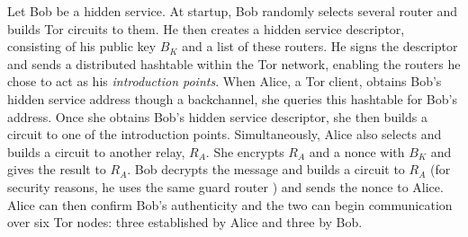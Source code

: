 Let Bob be a hidden service. At startup, Bob randomly selects several router and builds Tor circuits to them. He then creates a hidden service descriptor, consisting of his public key $ B_{K} $ and a list of these routers. He signs the descriptor and sends a distributed hashtable within the Tor network, enabling the routers he chose to act as his \textit{introduction points}. When Alice, a Tor client, obtains Bob's hidden service address though a backchannel, she queries this hashtable for Bob's address. Once she obtains Bob's hidden service descriptor, she then builds a circuit to one of the introduction points. Simultaneously, Alice also selects and builds a circuit to another relay, $ R_{A} $. She encrypts $ R_{A} $ and a nonce with $ B_{K} $ and gives the result to $ R_{A} $. Bob decrypts the message and builds a circuit to $ R_{A} $ (for security reasons, he uses the same guard router \cite{overlier2006locating}\cite{bauer2007low}) and sends the nonce to Alice. Alice can then confirm Bob's authenticity and the two can begin communication over six Tor nodes: three established by Alice and three by Bob.

